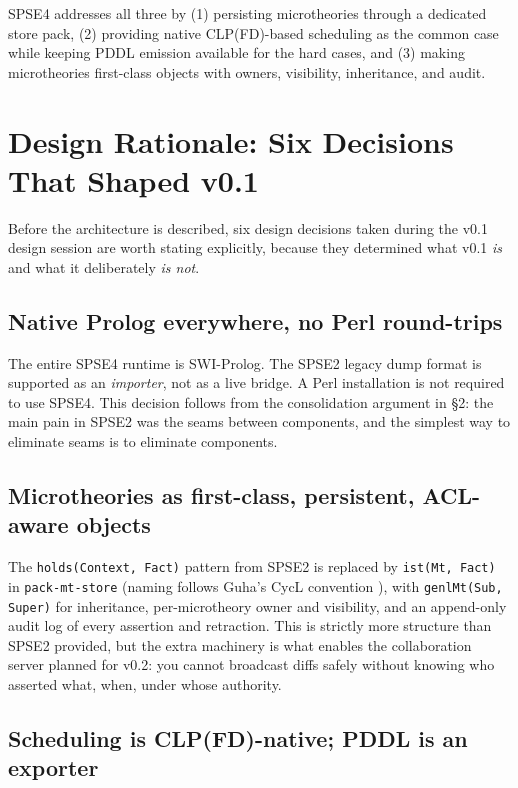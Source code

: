 \documentclass[11pt,letterpaper]{article}
\begin{document}
SPSE4 addresses all three by (1) persisting microtheories through a
dedicated store pack, (2) providing native CLP(FD)-based scheduling as the
common case while keeping PDDL emission available for the hard cases, and
(3) making microtheories first-class objects with owners, visibility,
inheritance, and audit.

\section{Design Rationale: Six Decisions That Shaped v0.1}
\label{sec:rationale}

Before the architecture is described, six design decisions taken during the
v0.1 design session are worth stating explicitly, because they determined
what v0.1 \emph{is} and what it deliberately \emph{is not}.

\subsection{Native Prolog everywhere, no Perl round-trips}

The entire SPSE4 runtime is SWI-Prolog. The SPSE2 legacy dump format is
supported as an \emph{importer}, not as a live bridge. A Perl installation
is not required to use SPSE4. This decision follows from the consolidation
argument in \S2: the main pain in SPSE2 was the seams between components,
and the simplest way to eliminate seams is to eliminate components.

\subsection{Microtheories as first-class, persistent, ACL-aware objects}

The \texttt{holds(Context, Fact)} pattern from SPSE2 is replaced by
\texttt{ist(Mt, Fact)} in \texttt{pack-mt-store} (naming follows Guha's
CycL convention \citep{guha-lenat-cyc-1990}), with \texttt{genlMt(Sub, Super)} for inheritance,
per-microtheory owner and visibility, and an append-only audit log of every
assertion and retraction. This is strictly more structure than SPSE2
provided, but the extra machinery is what enables the collaboration server
planned for v0.2: you cannot broadcast diffs safely without knowing who
asserted what, when, under whose authority.

\subsection{Scheduling is CLP(FD)-native; PDDL is an exporter}
\end{document}
